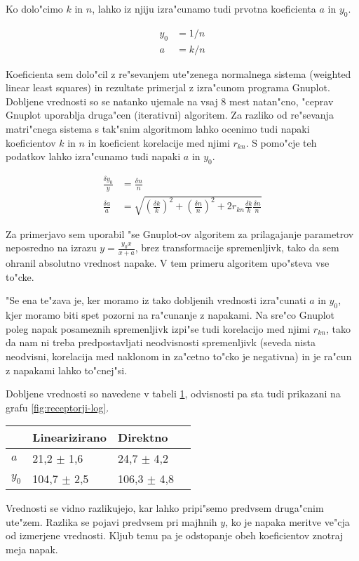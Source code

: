 \documentclass[a4paper,10pt]{article}
\begin{document}
Ko dolo"cimo $k$ in $n$, lahko iz njiju izra"cunamo tudi prvotna koeficienta $a$ in $y_0$. 

\begin{align}
 y_0 &= 1/n \\
 a &= k/n
\end{align}

Koeficienta sem dolo"cil z re"sevanjem ute"zenega normalnega sistema (weighted linear least squares) in rezultate primerjal z izra"cunom programa Gnuplot. Dobljene vrednosti so se natanko ujemale na vsaj 8 mest natan"cno, "ceprav Gnuplot uporablja druga"cen (iterativni) algoritem. Za razliko od re"sevanja matri"cnega sistema s tak"snim algoritmom lahko ocenimo tudi napaki koeficientov $k$ in $n$ in koeficient korelacije med njimi $r_{kn}$. S pomo"cje teh podatkov lahko izra"cunamo tudi napaki $a$ in $y_0$. 

\begin{align}
  \frac{\delta y_0}{y} &= \frac{\delta n}{n} \\
  \frac{\delta a}{a} &= \sqrt{ \left( \frac{\delta k}{k} \right)^2 + \left(\frac{\delta n}{n} \right)^2 + 2r_{kn} \frac{\delta k}{k}\frac{\delta n}{n}}
\end{align}

Za primerjavo sem uporabil "se Gnuplot-ov algoritem za prilagajanje parametrov neposredno na izrazu $y = \frac{y_0 x}{x+a}$, brez transformacije spremenljivk, tako da sem ohranil absolutno vrednost napake. V tem primeru algoritem upo"steva vse to"cke. 

"Se ena te"zava je, ker moramo iz tako dobljenih vrednosti izra"cunati $a$ in $y_0$, kjer moramo biti spet pozorni na ra"cunanje z napakami. Na sre"co Gnuplot poleg napak posameznih spremenljivk izpi"se tudi korelacijo med njimi $r_{kn}$, tako da nam ni treba predpostavljati neodvisnosti spremenljivk (seveda nista neodvisni, korelacija med naklonom in za"cetno to"cko je negativna) in je ra"cun z napakami lahko to"cnej"si. 

Dobljene vrednosti so navedene v tabeli \ref{tab:primerjava}, odvisnosti pa sta tudi prikazani na grafu \ref{fig:receptorji-log}. 

\begin{table}
\begin{tabular}{|l|l|l|l|}
  \hline
  & Linearizirano & Direktno \\
  \hline
  $a$ & 21,2 $\pm$ 1,6 & 24,7 $\pm$ 4,2\\
  $y_0$ & 104,7 $\pm$ 2,5 & 106,3 $\pm$ 4,8\\
  \hline
\end{tabular}

Vrednosti se vidno razlikujejo, kar lahko pripi"semo predvsem druga"cnim ute"zem. Razlika se pojavi predvsem pri majhnih $y$, ko je napaka meritve ve"cja od izmerjene vrednosti. Kljub temu pa je odstopanje obeh koeficientov znotraj meja napak. 

 \label{tab:primerjava}
\end{table}
\end{document}
